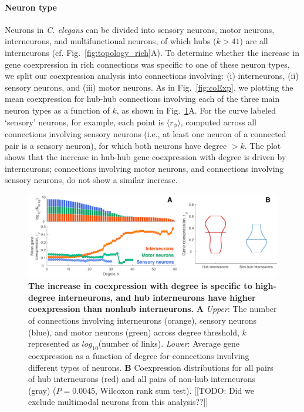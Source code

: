 \documentclass[10pt,letterpaper]{article}
\begin{document}
\paragraph{Neuron type}
Neurons in \emph{C. elegans} can be divided into sensory neurons, motor neurons, interneurons, and multifunctional neurons, of which hubs ($k > 41$) are all interneurons \cite{Towlson:2013gf} (cf. Fig.~\ref{fig:topology_rich}A).
To determine whether the increase in gene coexpression in rich connections was specific to one of these neuron types, we split our coexpression analysis into connections involving: (i) interneurons, (ii) sensory neurons, and (iii) motor neurons.
As in Fig.~\ref{fig:coExp}, we plotting the mean coexpression for hub-hub connections involving each of the three main neuron types as a function of $k$, as shown in Fig.~\ref{fig:interneuron_dep}A.
For the curve labeled `sensory' neurons, for example, each point is $\langle r_\phi \rangle$, computed across all connections involving sensory neurons (i.e., at least one neuron of a connected pair is a sensory neuron), for which both neurons have degree $>k$.
The plot shows that the increase in hub-hub gene coexpression with degree is driven by interneurons; connections involving motor neurons, and connections involving sensory neurons, do not show a similar increase.

\begin{figure}[h]
\centering
   \includegraphics[width=1\textwidth]{DegreeType.pdf}
 \caption{
\textbf{The increase in coexpression with degree is specific to high-degree interneurons, and hub interneurons have higher coexpression than nonhub interneurons.}
\textbf{A} \emph{Upper}: The number of connections involving interneurons (orange), sensory neurons (blue), and motor neurons (green) across degree threshold, $k$ represented as $log_{10}$(number of links).
\emph{Lower}: Average gene coexpression as a function of degree for connections involving different types of neurons.
\textbf{B} Coexpression distributions for all pairs of hub interneurons (red) and all pairs of non-hub interneurons (gray) ($P = 0.0045$, Wilcoxon rank sum test).
[[TODO: Did we exclude multimodal neurons from this analysis??]]
}
 \label{fig:interneuron_dep}
\end{figure}
\end{document}
